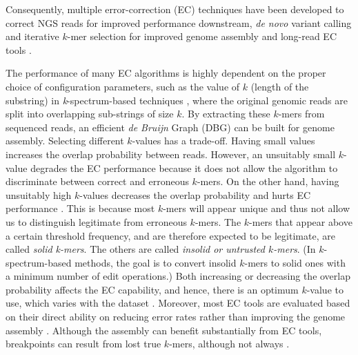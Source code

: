 Consequently, multiple error-correction (EC) techniques have been developed to correct NGS reads for improved performance downstream, \eg \textit{de novo} variant calling and iterative $k$-mer selection for improved genome assembly \cite{mahadik2017scalable} and long-read EC tools \cite{szalay2015novo, sameith2016iterative}. 

The performance of many EC algorithms is highly dependent on the proper choice of configuration parameters, such as the value of $k$ (length of the substring) in \textit{k}-spectrum-based techniques \cite{mahadik2017scalable}, where the original genomic reads are split into overlapping sub-strings of size $k$. By extracting these $k$-mers from sequenced reads, an efficient \textit{de Bruijn} Graph (DBG) \cite{compeau2011apply} can be built for genome assembly. Selecting different $k$-values has a trade-off. Having small values increases the overlap probability between reads. However, an unsuitably small $k$-value degrades the EC performance because it does not allow the algorithm to discriminate between correct and erroneous $k$-mers. On the other hand, having unsuitably high $k$-values decreases the overlap probability and hurts EC performance \cite{sameith2016iterative}. This is because most $k$-mers will appear unique and thus not allow us to distinguish legitimate from erroneous $k$-mers. 
The $k$-mers that appear above a certain threshold frequency, and are therefore expected to be legitimate, are called \textit{solid k-mers}. The others are called \textit{insolid or untrusted $k$-mers}. (In $k$-spectrum-based methods, the goal is to convert insolid $k$-mers to solid ones with a minimum number of edit operations.) Both increasing or decreasing the overlap probability affects the EC capability, and hence, there is an optimum $k$-value to use, which varies with the dataset \cite{heydari2017evaluation}. Moreover, most EC tools are evaluated based on their direct ability on reducing error rates rather than improving the genome assembly \cite{heydari2017evaluation}. Although the assembly can benefit substantially from EC tools, breakpoints can result from lost true $k$-mers, although not always \cite{heydari2017evaluation}.
